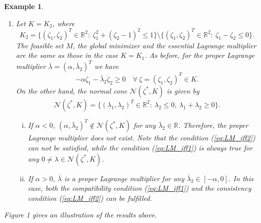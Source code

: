 \documentclass[leqno]{amsart}
\newtheorem{Example}[Theorem]{Example}
\theoremstyle{definition}
\begin{document}
\begin{Example}
\begin{enumerate}[$\bullet$]
\item Let $K = K_2$, where
$$
K_2 = \{(\zeta_1,\zeta_2)^T\in \mathbb{R}^2:\ \zeta_1^2 + (\zeta_2 -1)^2 \leq 1\}\setminus \{(\zeta_1,\zeta_2)^T\in \mathbb{R}^2:\ \zeta_1 - \zeta_2\leq 0\}.
$$
The feasible set $M$, the global minimizer and the essential Lagrange multiplier are the same as those in the case $K = K_1$. As before, for the proper Lagrange multiplier $\bar{\lambda} = (\alpha, \bar{\lambda}_2)^T$ we have
$$ -\alpha\zeta_1 - \bar{\lambda}_2 \zeta_2 \geq 0\quad \forall\ \zeta = (\zeta_1, \zeta_2)^T\in K.$$
On the other hand, the normal cone $\mathcal{N}(\zeta^*, K)$ is given by
$$\mathcal{N}(\zeta^*, K) = \{(\lambda_1, \lambda_2)^T\in \mathbb{R}^2:\ \lambda_2\leq 0,\ \lambda_1 + \lambda_2 \geq 0\}.$$

\begin{enumerate}[(i)]
\item If $\alpha<0$, $(\alpha, \bar{\lambda}_2)^T\not\in \mathcal{N}(\zeta^*, K)$ for any $\bar{\lambda}_2\in \mathbb{R}$. Therefore, the proper Lagrange multiplier does not exist. Note that the condition (\ref{eq:LM_iff2}) can not be satisfied, while the condition (\ref{eq:LM_iff1}) is always true for any $0\neq \lambda \in \mathcal{N}(\zeta^*, K)$.

\item If $\alpha>0$, $\bar{\lambda}$ is a proper Lagrange multiplier for any $\bar{\lambda}_2\in [-\alpha, 0]$. In this case, both the compatibility condition (\ref{eq:LM_iff1}) and the consistency condition (\ref{eq:LM_iff2}) can be fulfilled. 
\end{enumerate}

\end{enumerate}

Figure 1 gives an illustration of the results above. 

\begin{center}
\end{center}
\end{Example}
\end{document}
